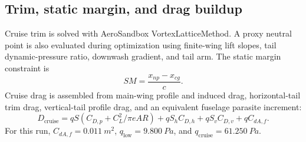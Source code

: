 \documentclass[11pt]{article}
\begin{document}
\subsection{Trim, static margin, and drag buildup}
Cruise trim is solved with AeroSandbox VortexLatticeMethod. A proxy neutral point is also evaluated during optimization using finite-wing lift slopes, tail dynamic-pressure ratio, downwash gradient, and tail arm. The static margin constraint is
\begin{equation}
SM = \frac{x_{np}-x_{cg}}{c}.
\end{equation}
Cruise drag is assembled from main-wing profile and induced drag, horizontal-tail trim drag, vertical-tail profile drag, and an equivalent fuselage parasite increment:
\begin{equation}
D_{\mathrm{cruise}} = qS(C_{D,p}+C_L^2/\pi e AR) + qS_h C_{D,h} + qS_v C_{D,v} + q C_{dA,f}.
\end{equation}
For this run, \(C_{dA,f}=\SI{0.011}{m^2}\), \(q_{\mathrm{low}}=\SI{9.800}{Pa}\), and \(q_{\mathrm{cruise}}=\SI{61.250}{Pa}\).
\end{document}

